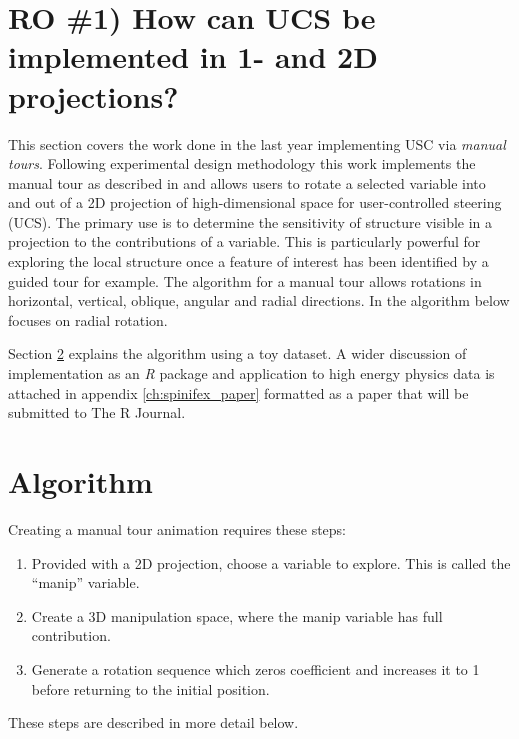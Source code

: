 \documentclass{monashthesis}
\begin{document}
\section{RO \#1) How can UCS be implemented in 1- and 2D
projections?}\label{ro-1-how-can-ucs-be-implemented-in-1--and-2d-projections}

This section covers the work done in the last year implementing USC via
\emph{manual tours}. Following experimental design methodology this work
implements the manual tour as described in \textcite{cook_manual_1997}
and allows users to rotate a selected variable into and out of a 2D
projection of high-dimensional space for user-controlled steering (UCS).
The primary use is to determine the sensitivity of structure visible in
a projection to the contributions of a variable. This is particularly
powerful for exploring the local structure once a feature of interest
has been identified by a guided tour \autocite{cook_grand_1995} for
example. The algorithm for a manual tour allows rotations in horizontal,
vertical, oblique, angular and radial directions. In the algorithm below
focuses on radial rotation.

Section \ref{sec:algorithm} explains the algorithm using a toy dataset.
A wider discussion of implementation as an \emph{R} package and
application to high energy physics data
\autocites{wang_visualizing_2018}{cook_dynamical_2018} is attached in
appendix \ref{ch:spinifex_paper} formatted as a paper that will be
submitted to The R Journal.

\section{Algorithm}\label{sec:algorithm}

Creating a manual tour animation requires these steps:

\begin{enumerate}
\def\labelenumi{\arabic{enumi}.}
\tightlist
\item
  Provided with a 2D projection, choose a variable to explore. This is
  called the ``manip'' variable.
\item
  Create a 3D manipulation space, where the manip variable has full
  contribution.
\item
  Generate a rotation sequence which zeros coefficient and increases it
  to 1 before returning to the initial position.
\end{enumerate}

These steps are described in more detail below.
\end{document}
